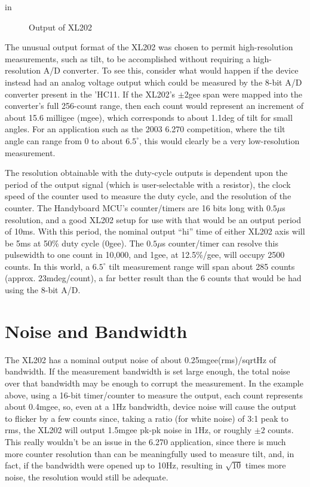  in
\begin{figure}[htbp]
\begin{center}
\caption{Output of XL202}
\label{outputwave}
\end{center}
\end{figure}

The unusual output format of the XL202 was chosen to permit
high-resolution measurements, such as tilt, to be accomplished without
requiring a high-resolution A/D converter.  To see this, consider what
would happen if the device instead had an analog voltage output which
could be measured by the 8-bit A/D converter present in the 'HC11.  If
the XL202's $\pm$2gee span were mapped into the converter's full
256-count range, then each count would represent an increment of about
15.6 milligee (mgee), which corresponds to about 1.1deg of tilt for
small angles.  For an application such as the 2003 6.270 competition,
where the tilt angle can range from 0 to about $6.5^\circ$, this would
clearly be a very low-resolution measurement.

The resolution obtainable with the duty-cycle outputs is dependent
upon the period of the output signal (which is user-selectable with a
resistor), the clock speed of the counter used to measure the duty
cycle, and the resolution of the counter. The Handyboard MCU's
counter/timers are 16 bits long with $0.5\mu$s resolution, and a good
XL202 setup for use with that would be an output period of 10ms.  With
this period, the nominal output ``hi'' time of either XL202 axis will be
5ms at 50\% duty cycle (0gee).  The $0.5\mu$s counter/timer can resolve
this pulsewidth to one
count in 10,000, and 1gee, at 12.5\%/gee, will occupy 2500 counts.  In
this world, a $6.5^\circ$ tilt measurement range will span about 285
counts (approx. 23mdeg/count), a far better result than the 6 counts
that would be had using the 8-bit A/D.

\section{Noise and Bandwidth}

The XL202 has a nominal output noise of about 0.25mgee(rms)/sqrtHz of
bandwidth.  If the measurement bandwidth is set large enough, the
total noise over that bandwidth may be enough to corrupt the
measurement.  In the example above, using a 16-bit timer/counter to
measure the output, each count represents about 0.4mgee, so, even at a
1Hz bandwidth, device noise will cause the output to flicker by a few
counts since, taking a ratio (for white noise) of 3:1 peak to rms, the
XL202 will output 1.5mgee pk-pk noise in 1Hz, or roughly $\pm 2$ counts.
This really wouldn't be an issue in the 6.270 application, since there
is much more counter resolution than can be meaningfully used to
measure tilt, and, in fact, if the bandwidth were opened up to 10Hz,
resulting in $\sqrt{10}$ times more noise, the resolution would still be
adequate.

